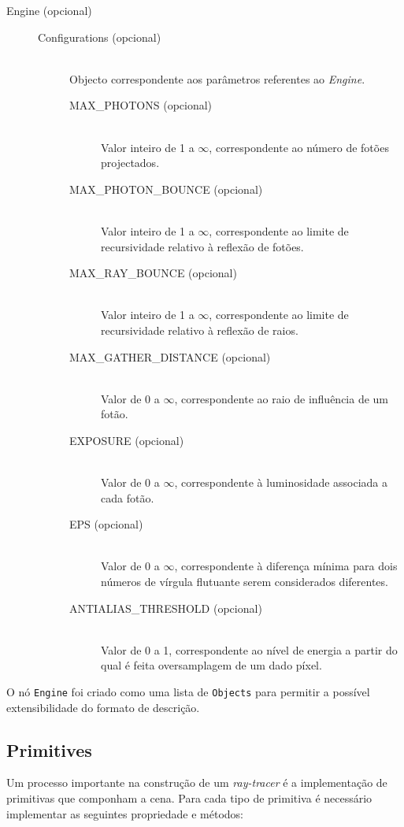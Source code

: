 \documentclass[a4paper]{article}
\begin{document}
\begin{description}
	\item[Engine (opcional)] \hfill
		\begin{description}
			\item[Configurations (opcional)] \hfill \\
				Objecto correspondente aos parâmetros referentes ao \emph{Engine}.
				\begin{description}
					\item[MAX\_PHOTONS (opcional)] \hfill \\
						Valor inteiro de 1 a $\infty$, correspondente ao número de fotões projectados.
					\item[MAX\_PHOTON\_BOUNCE (opcional)] \hfill \\
						Valor inteiro de 1 a $\infty$, correspondente ao limite de recursividade relativo à reflexão de fotões.
					\item[MAX\_RAY\_BOUNCE (opcional)] \hfill \\
						Valor inteiro de 1 a $\infty$, correspondente ao limite de recursividade relativo à reflexão de raios.
					\item[MAX\_GATHER\_DISTANCE (opcional)] \hfill \\
						Valor de 0 a $\infty$, correspondente ao raio de influência de um fotão.
					\item[EXPOSURE (opcional)] \hfill \\
						Valor de 0 a $\infty$, correspondente à luminosidade associada a cada fotão.
					\item[EPS (opcional)] \hfill \\
						Valor de 0 a $\infty$, correspondente à diferença mínima para dois números de vírgula flutuante serem considerados diferentes.
					\item[ANTIALIAS\_THRESHOLD (opcional)] \hfill \\
						Valor de 0 a 1, correspondente ao nível de energia a partir do qual é feita oversamplagem de um dado píxel.
				\end{description}
		\end{description}
\end{description}

O nó \texttt{Engine} foi criado como uma lista de \texttt{Objects} para permitir a possível extensibilidade do formato de descrição.

\cleardoublepage
\subsection{Primitives}
\label{sec:primitives}
\indent \indent Um processo importante na construção de um \emph{ray-tracer} é a implementação de primitivas que componham a cena.
Para cada tipo de primitiva é necessário implementar as seguintes propriedade e métodos:
\end{document}
